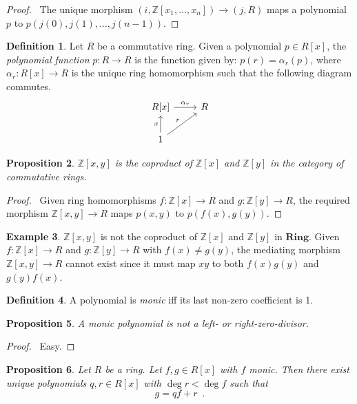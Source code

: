 \documentclass{book}
\let\qed\relax
\newtheorem{prop}{Proposition}[chapter]
\theoremstyle{definition}
\newtheorem{df}[prop]{Definition}
\newtheorem{ex}[prop]{Example}
\newcommand{\Ring}{\ensuremath{\mathbf{Ring}}}
\begin{document}
\begin{proof}
\pf\ The unique morphism $(i, \mathbb{Z}[x_1, \ldots, x_n]) \rightarrow (j, R)$ maps a polynomial $p$ to $p(j(0), j(1), \ldots, j(n-1))$. \qed
\end{proof}

\begin{df}
Let $R$ be a commutative ring.
Given a polynomial $p \in R[x]$, the \emph{polynomial function} $p : R \rightarrow R$ is the function given by: $p(r) = \alpha_r(p)$, where $\alpha_r : R[x] \rightarrow R$ is the unique ring homomorphism such that the following diagram commutes.
\[ \begin{tikzcd}
R[x] \arrow[r,"\alpha_r"] & R \\
1 \arrow[u,"x"] \arrow[ur,"r"]
\end{tikzcd} \]
\end{df}

\begin{prop}
$\mathbb{Z}[x,y]$ is the coproduct of $\mathbb{Z}[x]$ and $\mathbb{Z}[y]$ in the category of commutative rings.
\end{prop}

\begin{proof}
\pf\ Given ring homomorphisms $f : \mathbb{Z}[x] \rightarrow R$ and $g : \mathbb{Z}[y] \rightarrow R$, the required morphism $\mathbb{Z}[x,y] \rightarrow R$ maps $p(x,y)$ to $p(f(x),g(y))$. \qed
\end{proof}

\begin{ex}
$\mathbb{Z}[x,y]$ is not the coproduct of $\mathbb{Z}[x]$ and $\mathbb{Z}[y]$ in $\Ring$. Given $f : \mathbb{Z}[x] \rightarrow R$ and $g : \mathbb{Z}[y] \rightarrow R$ with $f(x) \neq g(y)$, the mediating morphism $\mathbb{Z}[x,y] \rightarrow R$ cannot exist since it must map $xy$ to both $f(x)g(y)$ and $g(y)f(x)$. \qed
\end{ex}

\begin{df}
A polynomial is \emph{monic} iff its last non-zero coefficient is 1.
\end{df}

\begin{prop}
A monic polynomial is not a left- or right-zero-divisor.
\end{prop}

\begin{proof}
\pf\ Easy. \qed
\end{proof}

\begin{prop}
Let $R$ be a ring. Let $f,g \in R[x]$ with $f$ monic. Then there exist unique polynomials $q,r \in R[x]$ with $\deg r < \deg f$ such that
\[ g = qf + r \enspace . \]
\end{prop}
\end{document}
